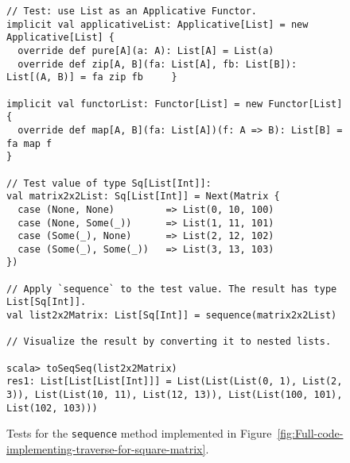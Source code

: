 \begin{figure}
\begin{centering}
\begin{lstlisting}[frame=single,fillcolor={\color{black}},framesep={0.2mm},framexleftmargin=2mm,framexrightmargin=2mm,framextopmargin=2mm,framexbottommargin=2mm]
// Test: use List as an Applicative Functor.
implicit val applicativeList: Applicative[List] = new Applicative[List] {
  override def pure[A](a: A): List[A] = List(a)
  override def zip[A, B](fa: List[A], fb: List[B]): List[(A, B)] = fa zip fb     }

implicit val functorList: Functor[List] = new Functor[List] {
  override def map[A, B](fa: List[A])(f: A => B): List[B] = fa map f
}

// Test value of type Sq[List[Int]]:
val matrix2x2List: Sq[List[Int]] = Next(Matrix {
  case (None, None)         => List(0, 10, 100)
  case (None, Some(_))      => List(1, 11, 101)
  case (Some(_), None)      => List(2, 12, 102)
  case (Some(_), Some(_))   => List(3, 13, 103)
})

// Apply `sequence` to the test value. The result has type List[Sq[Int]].
val list2x2Matrix: List[Sq[Int]] = sequence(matrix2x2List)

// Visualize the result by converting it to nested lists.

scala> toSeqSeq(list2x2Matrix)
res1: List[List[List[Int]]] = List(List(List(0, 1), List(2, 3)), List(List(10, 11), List(12, 13)), List(List(100, 101), List(102, 103))) 
\end{lstlisting}
\par\end{centering}
\caption{Tests for the \lstinline!sequence! method implemented in Figure~\ref{fig:Full-code-implementing-traverse-for-square-matrix}.\label{fig:Full-code-implementing-traverse-for-square-matrix-tests}}
\end{figure}

